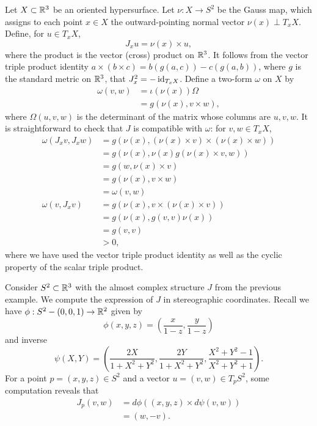 \documentclass{amsart}
\begin{document}
\begin{example}
    Let $X\subset\mathbb{R}^3$ be an oriented hypersurface. Let $\nu:X\to S^2$ be the Gauss map,
    which assigns to each point $x\in X$ the outward-pointing normal vector $\nu(x)\perp T_xX$.
    Define, for $u\in T_xX$,
    \begin{equation*}
        J_xu = \nu(x)\times u,
    \end{equation*}
    where the product is the vector (cross) product on $\mathbb{R}^3$. It follows from the vector triple
    product identity $a\times (b\times c)=b(g(a,c))-c(g(a,b))$, where $g$ is the standard
    metric on $\mathbb{R}^3$, that $J_x^2=-\operatorname{id}_{T_xX}$. Define a two-form $\omega$ on $X$ by 
    \begin{align*}
        \omega(v,w) &= \iota(\nu(x))\Omega\\
        &= g(\nu(x),v\times w),
    \end{align*}
    where $\Omega(u,v,w)$ is the determinant of the matrix whose columns are $u,v,w$.
    It is straightforward to check that $J$ is compatible with $\omega$: for $v,w\in T_xX$,
    \begin{align*}
        \omega(J_xv,J_xw) &= g\left(\nu(x),(\nu(x)\times v)\times(\nu(x)\times w)\right)\\
        &= g\left( \nu(x),\nu(x) g(\nu(x)\times v,w) \right)\\
        &= g(w,\nu(x)\times v)\\
        &= g(\nu(x),v\times w)\\
        &= \omega(v,w)\\
        \omega(v, J_xv) &= g(\nu(x), v\times (\nu(x)\times v))\\
        &=g(\nu(x),g(v,v)\nu(x))\\
        &=g(v,v)\\
        &>0,
    \end{align*}
    where we have used the vector triple product identity as well as the cyclic property of
    the scalar triple product.
    \label{ex:vecprod}
\end{example}

\begin{example}
    Consider $S^2\subset\mathbb{R}^3$ with the almost complex structure $J$ from the previous example.
    We compute the expression of $J$ in stereographic coordinates. Recall we have $\phi:S^2-(0,0,1)\to\mathbb{R}^2$
    given by
    \begin{equation*}
        \phi(x,y,z) = \left( \frac{x}{1-z}, \frac{y}{1-z} \right)
    \end{equation*}
    and inverse
    \begin{equation*}
        \psi(X,Y) = \left( \frac{2X}{1+X^2+Y^2},\frac{2Y}{1+X^2+Y^2},\frac{X^2+Y^2-1}{X^2+Y^2+1} \right).
    \end{equation*}
    For a point $p=(x,y,z)\in S^2$ and a vector $u=(v,w)\in T_pS^2$, some computation reveals that
    \begin{align*}
        J_p(v,w) &= d\phi\left((x,y,z)\times d\psi(v,w)\right)\\
        &= (w, -v).
    \end{align*}
\end{example}
\end{document}
